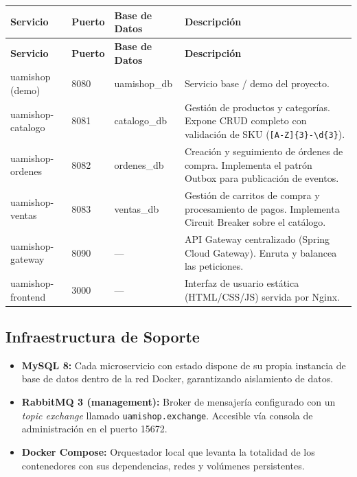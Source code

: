 \documentclass[12pt,a4paper]{article}
\begin{document}
\begin{longtable}{@{}p{4.2cm}p{1.4cm}p{2.5cm}p{5.8cm}@{}}
  \toprule
  \textbf{Servicio} & \textbf{Puerto} & \textbf{Base de Datos} & \textbf{Descripci\'on} \\
  \midrule
  \endfirsthead
  \toprule
  \textbf{Servicio} & \textbf{Puerto} & \textbf{Base de Datos} & \textbf{Descripci\'on} \\
  \midrule
  \endhead
  \bottomrule
  \endfoot
  uamishop (demo)        & 8080 & uamishop\_db      & Servicio base / demo del proyecto. \\[4pt]
  uamishop-catalogo      & 8081 & catalogo\_db      & Gesti\'on de productos y categor\'ias. Expone CRUD completo con validaci\'on de SKU (\texttt{[A-Z]\{3\}-\textbackslash d\{3\}}). \\[4pt]
  uamishop-ordenes       & 8082 & ordenes\_db       & Creaci\'on y seguimiento de \'ordenes de compra. Implementa el patr\'on Outbox para publicaci\'on de eventos. \\[4pt]
  uamishop-ventas        & 8083 & ventas\_db        & Gesti\'on de carritos de compra y procesamiento de pagos. Implementa Circuit Breaker sobre el cat\'alogo. \\[4pt]
  uamishop-gateway       & 8090 & ---               & API Gateway centralizado (Spring Cloud Gateway). Enruta y balancea las peticiones. \\[4pt]
  uamishop-frontend      & 3000 & ---               & Interfaz de usuario est\'atica (HTML/CSS/JS) servida por Nginx. \\
\end{longtable}

\subsection{Infraestructura de Soporte}

\begin{itemize}
  \item \textbf{MySQL 8:} Cada microservicio con estado dispone de su propia instancia de
        base de datos dentro de la red Docker, garantizando aislamiento de datos.
  \item \textbf{RabbitMQ 3 (management):} Broker de mensajer\'ia configurado con un
        \textit{topic exchange} llamado \texttt{uamishop.exchange}. Accesible v\'ia
        consola de administraci\'on en el puerto 15672.
  \item \textbf{Docker Compose:} Orquestador local que levanta la totalidad de los
        contenedores con sus dependencias, redes y vol\'umenes persistentes.
\end{itemize}
\end{document}
